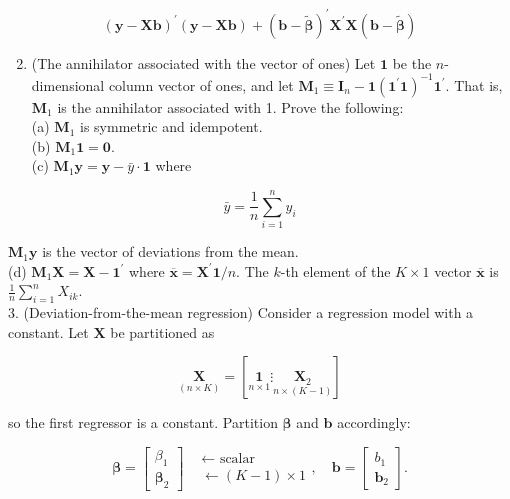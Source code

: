 \documentclass[10pt]{article}
\begin{document}
$$
(\mathbf{y}-\mathbf{X b})^{\prime}(\mathbf{y}-\mathbf{X b})+(\mathbf{b}-\widetilde{\boldsymbol{\beta}})^{\prime} \mathbf{X}^{\prime} \mathbf{X}(\mathbf{b}-\widetilde{\boldsymbol{\beta}})
$$

\begin{enumerate}
  \setcounter{enumi}{1}
  \item (The annihilator associated with the vector of ones) Let $\mathbf{1}$ be the $n$-dimensional column vector of ones, and let $\mathbf{M}_{1} \equiv \mathbf{I}_{n}-\mathbf{1}\left(\mathbf{1}^{\prime} \mathbf{1}\right)^{-1} \mathbf{1}^{\prime}$. That is, $\mathbf{M}_{1}$ is the annihilator associated with 1. Prove the following:\\
(a) $\mathbf{M}_{1}$ is symmetric and idempotent.\\
(b) $\mathbf{M}_{1} \mathbf{1}=\mathbf{0}$.\\
(c) $\mathbf{M}_{1} \mathbf{y}=\mathbf{y}-\bar{y} \cdot \mathbf{1}$ where
\end{enumerate}

$$
\bar{y}=\frac{1}{n} \sum_{i=1}^{n} y_{i}
$$

$\mathbf{M}_{1} \mathbf{y}$ is the vector of deviations from the mean.\\
(d) $\mathbf{M}_{1} \mathbf{X}=\mathbf{X}-\mathbf{1}^{\prime}$ where $\overline{\mathbf{x}}=\mathbf{X}^{\prime} \mathbf{1} / n$. The $k$-th element of the $K \times 1$ vector $\overline{\mathbf{x}}$ is $\frac{1}{n} \sum_{i=1}^{n} X_{i k}$.\\
3. (Deviation-from-the-mean regression) Consider a regression model with a constant. Let $\mathbf{X}$ be partitioned as

$$
\underset{(n \times K)}{\mathbf{X}}=\left[\underset{n \times 1}{\mathbf{1}} \vdots \underset{n \times(K-1)}{\mathbf{X}_{2}}\right]
$$

so the first regressor is a constant. Partition $\boldsymbol{\beta}$ and $\mathbf{b}$ accordingly:

$$
\boldsymbol{\beta}=\left[\begin{array}{l}
\beta_{1} \\
\boldsymbol{\beta}_{2}
\end{array}\right] \begin{aligned}
& \leftarrow \text { scalar } \\
& \leftarrow(K-1) \times 1
\end{aligned}, \quad \mathbf{b}=\left[\begin{array}{l}
b_{1} \\
\mathbf{b}_{2}
\end{array}\right] .
$$
\end{document}
